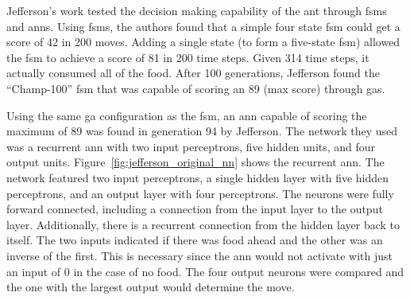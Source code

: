 Jefferson's work tested the decision making capability of the ant through \glspl{fsm} and \glspl{ann}. Using \glspl{fsm}, the authors found that a simple four state \gls{fsm} could get a score of 42 in 200 moves. Adding a single state (to form a five-state \gls{fsm}) allowed the \gls{fsm} to achieve a score of 81 in 200 time steps. Given 314 time steps, it actually consumed all of the food. After 100 generations, Jefferson found the ``Champ-100'' \gls{fsm} that was capable of scoring an 89 (max score) through \glspl{ga}.

Using the same \gls{ga} configuration as the \gls{fsm}, an \gls{ann} capable of scoring the maximum of 89 was found in generation 94 by Jefferson. The network they used was a recurrent \gls{ann} with two input perceptrons, five hidden units, and four output units. Figure~\ref{fig:jefferson_original_nn} shows the recurrent \gls{ann}. The network featured two input perceptrons, a single hidden layer with five hidden perceptrons, and an output layer with four perceptrons. The neurons were fully forward connected, including a connection from the input layer to the output layer. Additionally, there is a recurrent connection from the hidden layer back to itself. The two inputs indicated if there was food ahead and the other was an inverse of the first. This is necessary since the \gls{ann} would not activate with just an input of 0 in the case of no food. The four output neurons were compared and the one with the largest output would determine the move.

